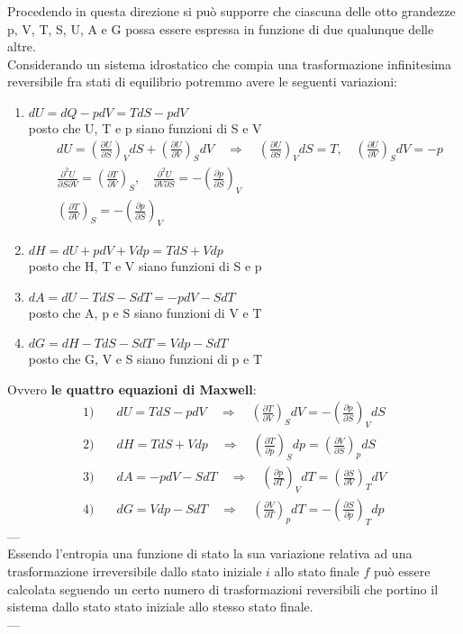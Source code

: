 \documentclass{article}
\newcommand{\So}{\quad \Rightarrow \quad}
\newcommand{\dpar}[3]{\left(\frac{\partial #1}{\partial #2}\right)_{#3}d#2}
\begin{document}
Procedendo in questa direzione si può supporre che ciascuna delle otto grandezze p, V, T, S, U, A e G possa essere espressa in funzione di due qualunque delle altre.\\
Considerando un sistema idrostatico che compia una trasformazione infinitesima reversibile fra stati di equilibrio potremmo avere le seguenti variazioni:
\begin{enumerate}
    \item $dU=dQ-pdV=TdS-pdV$ \\posto che U, T e p siano funzioni di S e V
    \begin{align*}
        &dU=\dpar{U}{S}{V}+\dpar{U}{V}{S} \So \dpar{U}{S}{V}=T, \quad \dpar{U}{V}{S}=-p\\
        &\frac{\partial^2 U}{\partial S \partial V}=\left(\frac{\partial T}{\partial V}\right)_S, \quad \frac{\partial^2 U}{\partial V\partial S }=-\left(\frac{\partial p}{\partial S}\right)_V \\  &\left(\frac{\partial T}{\partial V}\right)_S=-\left(\frac{\partial p}{\partial S}\right)_V
    \end{align*}
    \item $dH=dU+pdV+Vdp=TdS+Vdp$ \\posto che H, T e V siano funzioni di S e p
    \item $dA=dU-TdS-SdT=-pdV-SdT$ \\posto che A, p e S siano funzioni di V e T
    \item $dG=dH-TdS-SdT=Vdp-SdT$ \\posto che G, V e S siano funzioni di p e T
\end{enumerate}
Ovvero \textbf{le quattro equazioni di Maxwell}:
\begin{align*}
    1)&\quad dU=TdS-pdV \So \dpar{T}{V}{S}=-\dpar{p}{S}{V}\\
    2)&\quad dH=TdS+Vdp \So \dpar{T}{p}{S}=\dpar{V}{S}{p}\\
    3)&\quad dA=-pdV-SdT \So \dpar{p}{T}{V}=\dpar{S}{V}{T}\\
   4)&\quad dG=Vdp-SdT \So \dpar{V}{T}{p}=-\dpar{S}{p}{T}
\end{align*}
---\\
Essendo l'entropia una funzione di stato la sua variazione relativa ad una trasformazione irreversibile dallo stato iniziale $i$ allo stato finale $f$ può essere calcolata seguendo un certo numero di trasformazioni reversibili che portino il sistema dallo stato stato iniziale allo stesso stato finale.\\
---
\\
\end{document}
